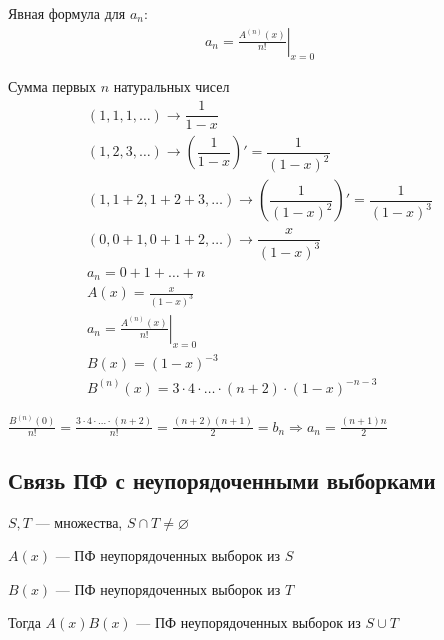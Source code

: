 \begin{remark}{}{}
    Явная формула для \( a_n \):
    \begin{gather*}
        a_n = \left. \frac{A^{(n)} (x) }{n!} \right|_{x = 0}
    \end{gather*}
\end{remark}

\begin{example}{Сумма первых \( n \) натуральных чисел}{}
    \begin{gather*}
        (1, 1, 1, \ldots) \longrightarrow \dfrac{1}{1 - x}
        \\
        (1, 2, 3, \ldots) \longrightarrow \left( \dfrac{1}{1 - x} \right)' = \dfrac{1}{(1 - x)^2}
        \\
        (1, 1 + 2, 1 + 2 + 3, \ldots) \longrightarrow \left( \dfrac{1}{(1 - x)^2} \right)' = \dfrac{1}{(1 - x)^3}
        \\
        (0, 0 + 1, 0 + 1 + 2, \ldots) \longrightarrow \dfrac{x}{(1 - x)^3}
        \\
        a_n = 0 + 1 + \ldots + n
        \\
        A(x) = \frac{x}{(1 - x)^3}
        \\
        a_n = \left. \frac{A^{(n)} (x) }{n!} \right|_{x = 0}
        \\
        B(x) = (1 - x)^{-3}
        \\
        B^{(n)} (x) = 3 \cdot 4 \cdot \ldots \cdot (n + 2) \cdot (1 - x)^{-n - 3}
    \end{gather*}

    \(
        \frac{B^{(n)} (0)}{n!} = \frac{3 \cdot 4 \cdot \ldots \cdot (n + 2)}{n!} = \frac{(n + 2)(n + 1)}{2} = b_n
        \Rightarrow
        a_n = \frac{(n + 1)n}{2}
    \)
\end{example}

\subsection{Связь ПФ с неупорядоченными выборками}

\( S, T \) --- множества, \( S \cap T \neq \varnothing \)

\( A(x) \) --- ПФ неупорядоченных выборок из \( S \)

\( B(x) \) --- ПФ неупорядоченных выборок из \( T \)

Тогда \( A(x) B(x) \) --- ПФ неупорядоченных выборок из \( S \cup T \)

